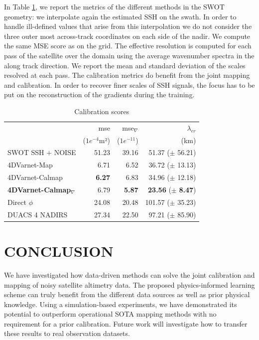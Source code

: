 \documentclass{article}
\begin{document}
In Table \ref{table:calscores}, we report the metrics of the different methods in the SWOT geometry: we interpolate again the estimated SSH on the swath. In order to handle ill-defined values that arise from this interpolation we do not consider the three outer most  across-track coordinates on each side of the nadir.
We compute the same MSE score as on the grid.
The effective resolution is computed for each pass of the satellite over the domain using the average wavenumber spectra in the along track direction. We report the mean and standard deviation of the scales resolved at each pass. The calibration metrics do benefit from the joint mapping and calibration. In order to recover finer scales of SSH signals, the focus has to be put on the reconstruction of the gradients during the training. 
\begin{table}
{\footnotesize
\begin{tabular}{lrrr}
\toprule
	{} &         mse &         mse${}_\nabla$ & $\lambda_{er}$  \\
	{} &    ($1e^{-4}$m²) &    ($1e^{-11}$) & (km) \\
\midrule
SWOT SSH + NOISE       &  51.23 &  39.16 & 51.37 ($\pm$ 56.21)\\
4DVarnet-Map           &  6.71 &  6.52 &  36.72 ($\pm$ 13.13) \\
4DVarnet-Calmap      &  \textbf{6.27} &  6.83 & 34.96 ($\pm$ 12.18)\\
\textbf{4DVarnet-Calmap}${}_{\nabla}$ &  6.79 &  \textbf{5.87} & \textbf{23.56} ($\pm$ \textbf{8.47}) \\
Direct  $\phi$        &  24.08 &  20.48 &  101.57 ($\pm$  35.23) \\
DUACS 4 NADIRS        &  27.34 &  22.50 &  97.21 ($\pm$ 85.90) \\
\bottomrule
\end{tabular}
}
\caption{Calibration scores}
\label{table:calscores}
\end{table}



\section{CONCLUSION}
We have investigated how data-driven methods can solve the joint calibration and mapping of noisy satellite altimetry data.
The proposed physics-informed learning scheme can truly benefit from the different data sources as well as prior physical knowledge. Using a simulation-based experiments, we have demonstrated its potential to outperform operational SOTA mapping methods with no requirement for a prior calibration. Future work will investigate how to transfer these results to real observation datasets.
\end{document}
